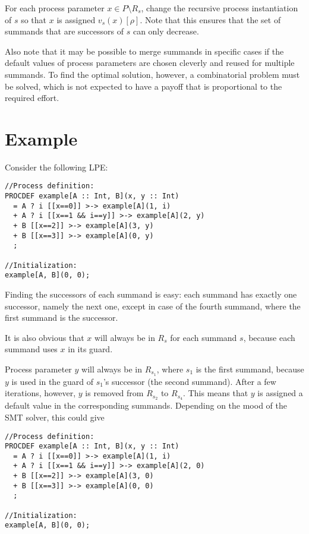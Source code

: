 \begin{enumerate}
For each process parameter $x \in P \setminus R_s$, change the recursive process instantiation of $s$ so that $x$ is assigned ${v_s}(x)[\rho]$.
Note that this ensures that the set of summands that are successors of $s$ can only decrease.

Also note that it may be possible to merge summands in specific cases if the default values of process parameters are chosen cleverly and reused for multiple summands.
To find the optimal solution, however, a combinatorial problem must be solved, which is not expected to have a payoff that is proportional to the required effort.

\end{enumerate}

\section{Example}

Consider the following LPE:

\begin{lstlisting}
//Process definition:
PROCDEF example[A :: Int, B](x, y :: Int)
  = A ? i [[x==0]] >-> example[A](1, i)
  + A ? i [[x==1 && i==y]] >-> example[A](2, y)
  + B [[x==2]] >-> example[A](3, y)
  + B [[x==3]] >-> example[A](0, y)
  ;

//Initialization:
example[A, B](0, 0);
\end{lstlisting}

Finding the successors of each summand is easy: each summand has exactly one successor, namely the next one, except in case of the fourth summand, where the first summand is the successor.

It is also obvious that $x$ will always be in $R_s$ for each summand $s$, because each summand uses $x$ in its guard.

Process parameter $y$ will always be in $R_{s_1}$, where $s_1$ is the first summand, because $y$ is used in the guard of $s_1$'s successor (the second summand).
After a few iterations, however, $y$ is removed from $R_{s_2}$ to $R_{s_4}$.
This means that $y$ is assigned a default value in the corresponding summands.
Depending on the mood of the SMT solver, this could give

\begin{lstlisting}
//Process definition:
PROCDEF example[A :: Int, B](x, y :: Int)
  = A ? i [[x==0]] >-> example[A](1, i)
  + A ? i [[x==1 && i==y]] >-> example[A](2, 0)
  + B [[x==2]] >-> example[A](3, 0)
  + B [[x==3]] >-> example[A](0, 0)
  ;

//Initialization:
example[A, B](0, 0);
\end{lstlisting}




